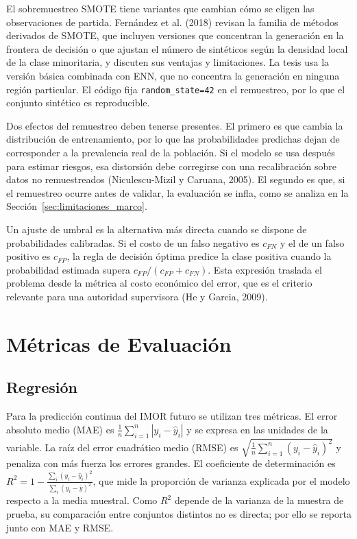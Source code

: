 El sobremuestreo SMOTE tiene variantes que cambian cómo se eligen las observaciones de partida. Fernández et al. (2018) revisan la familia de métodos derivados de SMOTE, que incluyen versiones que concentran la generación en la frontera de decisión o que ajustan el número de sintéticos según la densidad local de la clase minoritaria, y discuten sus ventajas y limitaciones. La tesis usa la versión básica combinada con ENN, que no concentra la generación en ninguna región particular. El código fija \texttt{random\_state=42} en el remuestreo, por lo que el conjunto sintético es reproducible.

Dos efectos del remuestreo deben tenerse presentes. El primero es que cambia la distribución de entrenamiento, por lo que las probabilidades predichas dejan de corresponder a la prevalencia real de la población. Si el modelo se usa después para estimar riesgos, esa distorsión debe corregirse con una recalibración sobre datos no remuestreados (Niculescu-Mizil y Caruana, 2005). El segundo es que, si el remuestreo ocurre antes de validar, la evaluación se infla, como se analiza en la Sección~\ref{sec:limitaciones_marco}.

Un ajuste de umbral es la alternativa más directa cuando se dispone de probabilidades calibradas. Si el costo de un falso negativo es $c_{FN}$ y el de un falso positivo es $c_{FP}$, la regla de decisión óptima predice la clase positiva cuando la probabilidad estimada supera $c_{FP}/(c_{FP}+c_{FN})$. Esta expresión traslada el problema desde la métrica al costo económico del error, que es el criterio relevante para una autoridad supervisora (He y Garcia, 2009).%

\section{Métricas de Evaluación}\label{sec:metricas}

\subsection{Regresión}
Para la predicción continua del IMOR futuro se utilizan tres métricas. El error absoluto medio (MAE) es $\frac{1}{n}\sum_{i=1}^n |y_i-\hat{y}_i|$ y se expresa en las unidades de la variable. La raíz del error cuadrático medio (RMSE) es $\sqrt{\frac{1}{n}\sum_{i=1}^n (y_i-\hat{y}_i)^2}$ y penaliza con más fuerza los errores grandes. El coeficiente de determinación es $R^2 = 1-\frac{\sum_i (y_i-\hat{y}_i)^2}{\sum_i (y_i-\bar{y})^2}$, que mide la proporción de varianza explicada por el modelo respecto a la media muestral. Como $R^2$ depende de la varianza de la muestra de prueba, su comparación entre conjuntos distintos no es directa; por ello se reporta junto con MAE y RMSE.

